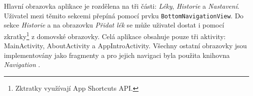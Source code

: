 \documentclass[../TakeYourPill.tex]{subfiles}
\begin{document}
Hlavní obrazovka aplikace je rozdělena na tři části: \textit{Léky}, \textit{Historie} a \textit{Nastavení}. Uživatel mezi těmito sekcemi přepíná pomocí prvku \texttt{BottomNavigationView}. Do sekce \textit{Historie} a na obrazovku \textit{Přidat lék} se může uživatel dostat i pomocí zkratky\footnote{Zktratky využívají App Shortcuts API.} z domovské obrazovky. Celá aplikace obsahuje pouze tři aktivity: MainActivity, AboutActivity a AppIntroActivity. Všechny ostatní obrazovky jsou implementovány jako fragmenty a pro jejich navigaci byla použita knihovna \textit{Navigation} \cite{navigation}.
\end{document}
